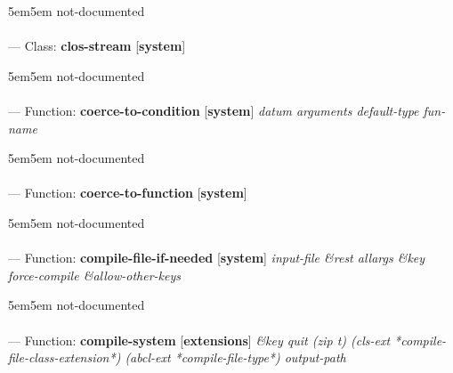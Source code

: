 \begin{adjustwidth}{5em}{5em}
not-documented
\end{adjustwidth}

\paragraph{}
\label{SYSTEM:CLOS-STREAM}
--- Class: \textbf{clos-stream} [\textbf{system}] \textit{}

\begin{adjustwidth}{5em}{5em}
not-documented
\end{adjustwidth}

\paragraph{}
\label{SYSTEM:COERCE-TO-CONDITION}
--- Function: \textbf{coerce-to-condition} [\textbf{system}] \textit{datum arguments default-type fun-name}

\begin{adjustwidth}{5em}{5em}
not-documented
\end{adjustwidth}

\paragraph{}
\label{SYSTEM:COERCE-TO-FUNCTION}
--- Function: \textbf{coerce-to-function} [\textbf{system}] \textit{}

\begin{adjustwidth}{5em}{5em}
not-documented
\end{adjustwidth}

\paragraph{}
\label{SYSTEM:COMPILE-FILE-IF-NEEDED}
--- Function: \textbf{compile-file-if-needed} [\textbf{system}] \textit{input-file \&rest allargs \&key force-compile \&allow-other-keys}

\begin{adjustwidth}{5em}{5em}
not-documented
\end{adjustwidth}

\paragraph{}
\label{EXTENSIONS:COMPILE-SYSTEM}
--- Function: \textbf{compile-system} [\textbf{extensions}] \textit{\&key quit (zip t) (cls-ext *compile-file-class-extension*) (abcl-ext *compile-file-type*) output-path}

